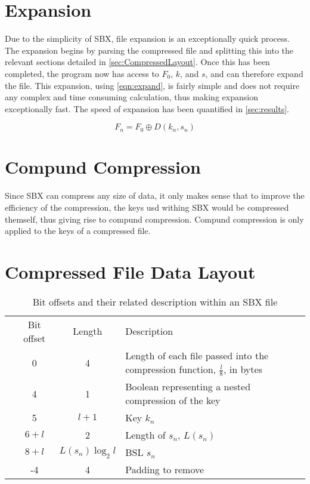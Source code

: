 \documentclass{hehe}
\begin{document}
\section{Expansion}

Due to the simplicity of SBX, file expansion is an exceptionally quick process. The expansion begins by parsing the compressed file and splitting this into the relevant sections detailed in \autoref{sec:CompressedLayout}. Once this has been completed, the program now has access to $F_0$, $k$, and $s$, and can therefore expand the file. This expansion, using \cref{eqn:expand}, is fairly simple and does not require any complex and time consuming calculation, thus making expansion exceptionally fast. The speed of expansion has been quantified in \autoref{sec:results}.

\begin{equation}\label{eqn:expand}
  F_n=F_0\oplus D(k_n, s_n)
\end{equation}

\section{Compund Compression}

Since SBX can compress any size of data, it only makes sense that to improve the efficiency of the compression, the keys usd withing SBX would be compressed themself, thus giving rise to compund compression. Compund compression is only applied to the keys of a compressed file.


\section{Compressed File Data Layout}
\label{sec:CompressedLayout}

\begin{table}[ht]
    \centering
    \begin{tabular}{c c | c | >{\raggedright\arraybackslash}p{7.5cm}}
        \hline
         & Bit offset & Length & Description \\
        \Xhline{3\arrayrulewidth}
        \cellcolor{red} & 0 & 4 & Length of each file passed into the compression function, $\frac{l}{8}$, in bytes \\
        \cellcolor{blue} & 4 & 1 & Boolean representing a nested compression of the key \\
        \cellcolor{blue} & 5 & $l+1$ & Key $k_n$ \\
        \cellcolor{blue} & $6+l$ & 2 & Length of $s_n$, $L(s_n)$ \\
        \cellcolor{blue} & $8+l$ & $L(s_n)\log_2l$ & BSL $s_n$ \\
        \cellcolor{orange} & -4 & 4 & Padding to remove \\
        \hline
    \end{tabular}
    \caption{Bit offsets and their related description within an SBX file}
    \label{tab:dataLayout}
\end{table}
\end{document}
